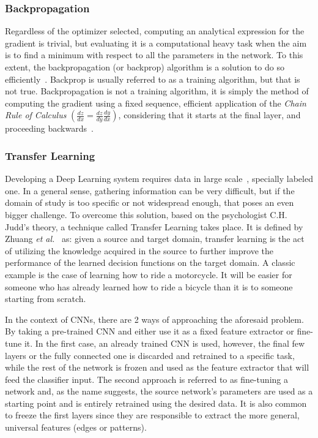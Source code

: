 \documentclass[class=report, crop=false, a4paper, 12pt]{standalone}
\begin{document}
\subsubsection{Backpropagation}
\par Regardless of the optimizer selected, computing an analytical expression for the gradient is trivial, but evaluating it is a computational heavy task when the aim is to find a minimum with respect to all the parameters in the network. To this extent, the backpropagation (or backprop) algorithm is a solution to do so efficiently~\autocite{6795724}. Backprop is usually referred to as a training algorithm, but that is not true. Backpropagation is not a training algorithm, it is simply the method of computing the gradient using a fixed sequence, efficient application of the \textit{Chain Rule of Calculus} $\left(\frac{dz}{dx} = \frac{dz}{dy}\frac{dy}{dx}\right)$, considering that it starts at the final layer, and proceeding backwards~\autocite{Goodfellow-et-al-2016}. 

\label{transf learning}
\subsubsection{Transfer Learning} %
\par Developing a Deep Learning system requires data in large scale~\autocite{parkhiDeepFaceRecognition2015}, specially labeled one. In a general sense, gathering information can be very difficult, but if the domain of study is too specific or not widespread enough, that poses an even bigger challenge. To overcome this solution, based on the psychologist C.H. Judd's theory, a technique called Transfer Learning takes place. It is defined by Zhuang \textit{et al.}~\autocite{zhuangComprehensiveSurveyTransfer2020} as: given a source and target domain, transfer learning is the act of utilizing the knowledge acquired in the source to further improve the performance of the learned decision functions on the target domain. A classic example is the case of learning how to ride a motorcycle. It will be easier for someone who has already learned how to ride a bicycle than it is to someone starting from scratch.
\par In the context of CNNs, there are 2 ways of approaching the aforesaid problem. By taking a pre-trained CNN and either use it as a fixed feature extractor or fine-tune it. In the first case, an already trained CNN is used, however, the final few layers or the fully connected one is discarded and retrained to a specific task, while the rest of the network is frozen and used as the feature extractor that will feed the classifier input. The second approach is referred to as fine-tuning a network and, as the name suggests, the source network's parameters are used as a starting point and is entirely retrained using the desired data. It is also common to freeze the first layers since they are responsible to extract the more general, universal features (edges or patterns).
\end{document}
